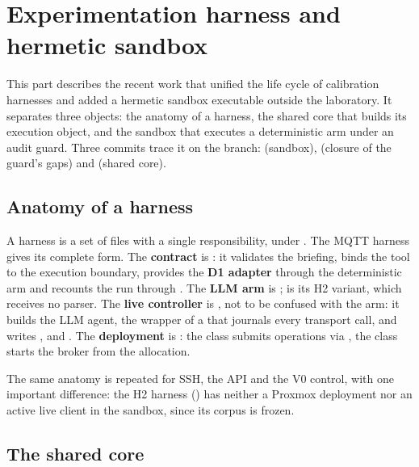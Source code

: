 \section{Experimentation harness and hermetic sandbox}\label{sec:harnais-sandbox}

This part describes the recent work that unified the life cycle of calibration
harnesses and added a hermetic sandbox executable outside the laboratory. It
separates three objects: the anatomy of a harness, the shared core that builds its
execution object, and the sandbox that executes a deterministic arm under an audit
guard. Three commits trace it on the  branch:  (sandbox),
 (closure of the guard's gaps) and  (shared core).

\subsection{Anatomy of a harness}

A harness is a set of files with a single responsibility, under
. The MQTT harness gives its complete form. The
\textbf{contract} is : it validates the briefing, binds
the tool to the execution boundary, provides the \textbf{D1 adapter} through the
deterministic arm  and recounts the run through
. The \textbf{LLM arm} is ;
 is its H2 variant, which receives no parser. The
\textbf{live controller} is , not to be confused
with the arm: it builds the LLM agent, the wrapper of a 
that journals every transport call, and writes ,
 and . The \textbf{deployment} is
: the class  submits operations
via , the class  starts the broker from the
allocation.

The same anatomy is repeated for SSH, the API and the V0 control, with one
important difference: the H2 harness () has neither a
Proxmox deployment nor an active live client in the sandbox, since its corpus is
frozen.

\subsection{The shared core}

